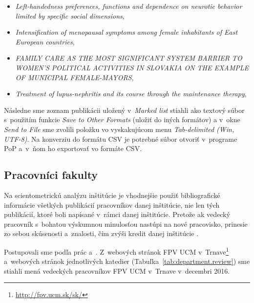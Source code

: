 \begin{itemize}
\item \emph{Left-handedness preferences, functions and dependence on neurotic
    behavior limited by specific social dimensions},
\item \emph{Intensification of menopausal symptoms among female inhabitants of
    East European countries},
\item \emph{FAMILY CARE AS THE MOST SIGNIFICANT SYSTEM BARRIER TO WOMEN'S
    POLITICAL ACTIVITIES IN SLOVAKIA ON THE EXAMPLE OF MUNICIPAL FEMALE-MAYORS},
\item \emph{Treatment of lupus-nephritis and its course through the maintenance
    therapy},
\end{itemize}

Následne sme zoznam publikácii uložený v~\emph{Marked list} stiahli ako textový
súbor s~použitím funkcie \emph{Save to Other Formats} (uložiť do iných formátov)
a v~okne \emph{Send to File} sme zvolili položku vo vyskakujúcom menu
\emph{Tab-delimited (Win, UTF-8)}.  Na konverziu do formátu CSV je potrebné
súbor otvoriť v~programe PoP \citep{Harzing2011} a~v~ňom ho exportovať vo
formáte CSV.


\subsection{Pracovníci fakulty}
\label{sec:staff.mining}

Na scientometrickú analýzu inštitúcie je vhodnejšie použiť bibliografické
informácie všetkých publikácií pracovníkov danej inštitúcie, nie len tých
publikácií, ktoré boli napísané v~rámci danej inštitúcie.  Pretože ak vedecký
pracovník s~bohatou výskumnou minulosťou nastúpi na nové pracovisko, prinesie zo
sebou skúsenosti a~znalosti, čím zvýši kredit danej inštitúcie
\citep{Altanopoulou2012}.

Postupovali sme podľa prác \citet{Kazakis2014a}
a~\citet{Kazakis2014b,Kazakis2015}.  Z~webových stránok FPV UCM
v~Trnave\footnote{\url{http://fpv.ucm.sk/sk/}} a~webových stránok jednotlivých
katedier (Tabuľka~\ref{tab:department.review}) sme stiahli mená vedeckých
pracovníkov FPV UCM v~Trnave v~decembri 2016.

